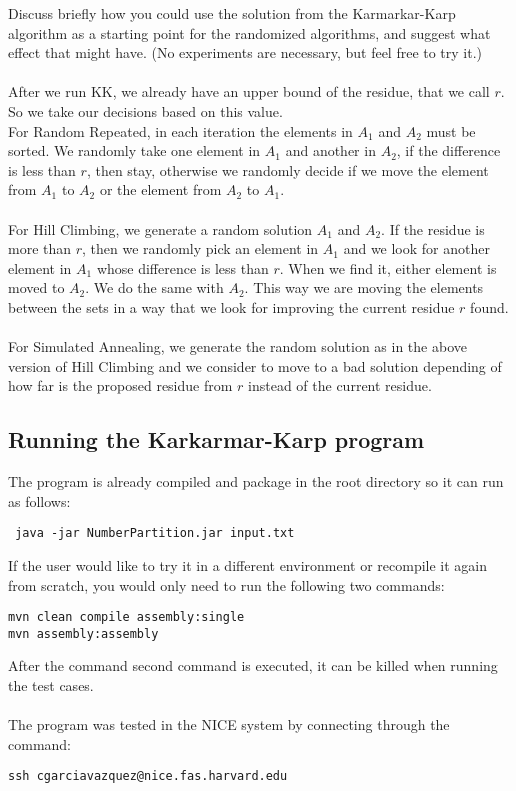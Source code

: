 \documentclass[tikz, 12pt]{scrartcl}
\begin{document}
Discuss briefly how you could use the solution from the Karmarkar-Karp algorithm as a starting point for the randomized algorithms, and suggest what effect that might have. (No experiments are necessary, but feel free to try it.)\\
\\
After we run KK, we already have an upper bound of the residue, that we call $r$. So we take our decisions based on this value.\\
For Random Repeated, in each iteration the elements in $A_1$ and $A_2$ must be sorted. We randomly take one element in $A_1$ and another in $A_2$, if the difference is less than $r$, then stay, otherwise we randomly decide if we move the element from $A_1$ to $A_2$ or the element from $A_2$ to $A_1$. \\
\\
For Hill Climbing, we generate a random solution $A_1$ and $A_2$. If the residue is more than $r$, then we randomly pick an element in $A_1$ and we look for another element in $A_1$ whose difference is less than $r$. When we find it, either element is moved to $A_2$. We do the same with $A_2$. This way we are moving the elements between the sets in a way that we look for improving the current residue $r$ found. \\
\\
For Simulated Annealing, we generate the random solution as in the above version of Hill Climbing and we consider to move to a bad solution depending of how far is the proposed residue from $r$ instead of the current residue.
\subsection{Running the Karkarmar-Karp program}
The program is already compiled and package in the root directory so it can run as follows:

\begin{verbatim}
 java -jar NumberPartition.jar input.txt 
\end{verbatim}

If the user would like to try it in a different environment or recompile it again from scratch, you would only need to run the following two commands:

\begin{verbatim}
mvn clean compile assembly:single
mvn assembly:assembly
\end{verbatim}

After the command second command is executed, it can be killed when running the test cases.\\
\\
The program was tested in the NICE system by connecting through the command:
\begin{verbatim}
ssh cgarciavazquez@nice.fas.harvard.edu
\end{verbatim}
\end{document}
